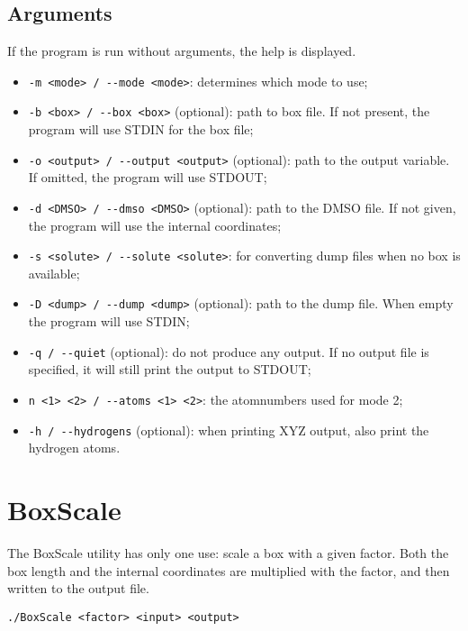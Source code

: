 \section{Arguments}
If the program is run without arguments, the help is displayed.

\begin{itemize}
	\item \verb|-m <mode> / --mode <mode>|: determines which mode to use;
	\item \verb|-b <box> / --box <box>| (optional): path to box file. If not 
	present, the program will use STDIN for the box file;
	\item \verb|-o <output> / --output <output>| (optional): path to the output 
	variable. If omitted, the program will use STDOUT;
	\item \verb|-d <DMSO> / --dmso <DMSO>| (optional): path to the DMSO file. 
	If not given, the program will use the internal coordinates;
	\item \verb|-s <solute> / --solute <solute>|: for converting dump files 
	when no box is available;
	\item \verb|-D <dump> / --dump <dump>| (optional): path to the dump file. 
	When empty the program will use STDIN;
	\item \verb|-q / --quiet| (optional): do not produce any output. If no 
	output file is 
	specified, it will still print the output to STDOUT;
	\item \verb|n <1> <2> / --atoms <1> <2>|: the atomnumbers used for mode 2;
	\item \verb|-h / --hydrogens| (optional): when printing XYZ output, also 
	print the hydrogen atoms.
\end{itemize}

\chapter{BoxScale}
The BoxScale utility has only one use: scale a box with a given factor. Both 
the box length and the internal coordinates are multiplied with the factor, and 
then written to the output file.

\begin{lstlisting}[caption=BoxScale]
	./BoxScale <factor> <input> <output>
\end{lstlisting}